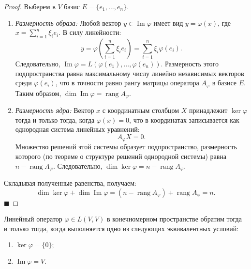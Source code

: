 \begin{proof}
Выберем в $V$ базис $E = \{e_1, \dots, e_n\}$. 
\begin{enumerate}
    \item \textit{Размерность образа:} Любой вектор $y \in \operatorname{Im} \varphi$ имеет вид $y = \varphi(x)$, где $x = \sum_{i=1}^n \xi_i e_i$. В силу линейности:
    \[
    y = \varphi\left(\sum_{i=1}^n \xi_i e_i\right) = \sum_{i=1}^n \xi_i \varphi(e_i).
    \]
    Следовательно, $\operatorname{Im} \varphi = L(\varphi(e_1), \dots, \varphi(e_n))$. Размерность этого подпространства равна максимальному числу линейно независимых векторов среди $\varphi(e_i)$, что в точности равно рангу матрицы оператора $A_\varphi$ в базисе $E$. Таким образом, $\dim \operatorname{Im} \varphi = \operatorname{rang} A_\varphi$.
    
    \item \textit{Размерность ядра:} Вектор $x$ с координатным столбцом $X$ принадлежит $\ker \varphi$ тогда и только тогда, когда $\varphi(x) = 0$, что в координатах записывается как однородная система линейных уравнений:
    \[
    A_\varphi X = 0.
    \]
    Множество решений этой системы образует подпространство, размерность которого (по теореме о структуре решений однородной системы) равна $n - \operatorname{rang} A_\varphi$. Следовательно, $\dim \ker \varphi = n - \operatorname{rang} A_\varphi$.
\end{enumerate}
Складывая полученные равенства, получаем:
\[
\dim \ker \varphi + \dim \operatorname{Im} \varphi = (n - \operatorname{rang} A_\varphi) + \operatorname{rang} A_\varphi = n.
\]
\hfill$\blacksquare$
\end{proof}

\begin{corollary}
Линейный оператор $\varphi \in L(V, V)$ в конечномерном пространстве обратим тогда и только тогда, когда выполняется одно из следующих эквивалентных условий:
\begin{enumerate}
    \item $\ker \varphi = \{0\}$;
    \item $\operatorname{Im} \varphi = V$.
\end{enumerate}
\end{corollary}

